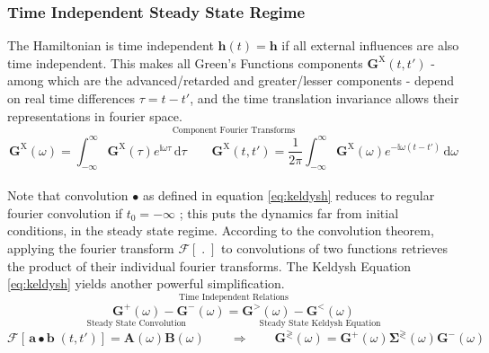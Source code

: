 \documentclass{article}[12pt]
\numberwithin{equation}{section}
\begin{document}
\subsubsection{Time Independent Steady State Regime}\label{s2.3.5}
The Hamiltonian is time independent
$\mathbf h(t)=\mathbf h$ if all external influences are also time independent.
This makes all Green's  Functions components $\mathbf G^{\mathrm X}(t,t')$ -
among which are the advanced/retarded and greater/lesser components - depend
on real time differences $\tau=t-t'$, and the time translation invariance  allows
their representations in fourier space.
\begin{equation}\label{eq:fourier-representation}
\overset{\text{Component Fourier Transforms}}
{\mathbf{G}^{\mathrm X}(\omega)=
\int_{-\infty}^{\infty}\!\mathbf{G}^{\mathrm X}(\tau)
e^{\mathbb i\omega\tau}\,\mathrm{d}\tau
\qquad
\mathbf{G}^{\mathrm X}(t,t')=
\frac{1}{2\pi}\int_{-\infty}^{\infty}\!\mathbf{G}^{\mathrm X}(\omega)
e^{-\mathbb i\omega(t-t')}\,\mathrm{d}\omega}
\end{equation}
\vspace{-10pt}\\
Note that
 convolution $\bullet$ as defined in equation \eqref{eq:keldysh} reduces to regular fourier convolution
if $t_0=-\infty$ ; this puts the dynamics far from initial conditions, in the steady state regime. According to the convolution theorem,  applying the fourier transform $\mathcal{F}[\;.\;]$ to convolutions of two functions retrieves the product of their  individual fourier transforms. The Keldysh Equation \eqref{eq:keldysh} yields another powerful simplification.
\vspace{7pt}
\begin{equation}\label{eq:steady-state-symmetry}
\overset{\text{Time Independent Relations}}
{\mathbf{G}^{+}(\omega)-\mathbf{G}^{-}(\omega)=
\mathbf{G}^{>}(\omega)-\mathbf{G}^{<}(\omega)}
\end{equation}
\begin{equation*}
\overset{\text{Steady State Convolution }
\qquad\qquad\qquad\qquad
\text{Steady State Keldysh Equation}}{}
\end{equation*}\vspace{-35pt}
\begin{equation*}
\mathcal{F}[\,\mathbf{a}\bullet\mathbf{b}\;(t,t')]=
\mathbf{A}(\omega)\mathbf{B}(\omega)
\qquad\Rightarrow\qquad
\mathbf{G}^{\gtrless}(\omega)=
\mathbf{G}^{+}
(\omega)\mathbf{\Sigma}^{\gtrless}(\omega)
\mathbf{G}^{-}(\omega)
\end{equation*}
\end{document}

